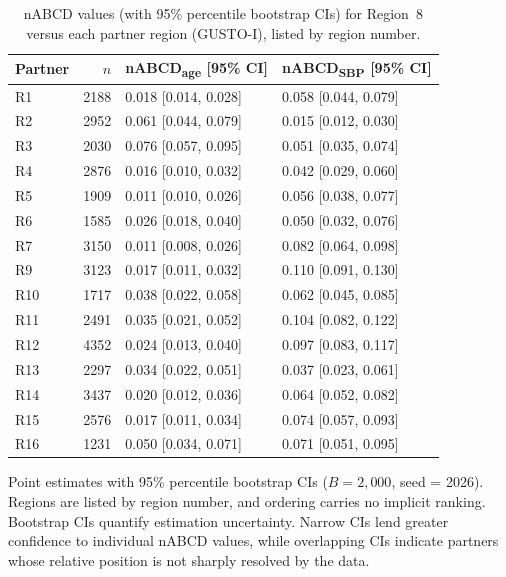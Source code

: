\documentclass[AMA,Times1COL]{WileyNJDv5}
\begin{document}
\begin{table}[ht]
\centering
\caption{nABCD values (with 95\% percentile bootstrap CIs) for Region~8 versus each partner region (GUSTO-I), listed by region number.\label{tab:gusto_nabcd}}
\begin{tabular}{lrll}
\toprule
\textbf{Partner} & $n$ & \textbf{nABCD\textsubscript{age} [95\% CI]} & \textbf{nABCD\textsubscript{SBP} [95\% CI]} \\
\midrule
R1  & 2188 & 0.018 [0.014, 0.028] & 0.058 [0.044, 0.079] \\
R2  & 2952 & 0.061 [0.044, 0.079] & 0.015 [0.012, 0.030] \\
R3  & 2030 & 0.076 [0.057, 0.095] & 0.051 [0.035, 0.074] \\
R4  & 2876 & 0.016 [0.010, 0.032] & 0.042 [0.029, 0.060] \\
R5  & 1909 & 0.011 [0.010, 0.026] & 0.056 [0.038, 0.077] \\
R6  & 1585 & 0.026 [0.018, 0.040] & 0.050 [0.032, 0.076] \\
R7  & 3150 & 0.011 [0.008, 0.026] & 0.082 [0.064, 0.098] \\
R9  & 3123 & 0.017 [0.011, 0.032] & 0.110 [0.091, 0.130] \\
R10 & 1717 & 0.038 [0.022, 0.058] & 0.062 [0.045, 0.085] \\
R11 & 2491 & 0.035 [0.021, 0.052] & 0.104 [0.082, 0.122] \\
R12 & 4352 & 0.024 [0.013, 0.040] & 0.097 [0.083, 0.117] \\
R13 & 2297 & 0.034 [0.022, 0.051] & 0.037 [0.023, 0.061] \\
R14 & 3437 & 0.020 [0.012, 0.036] & 0.064 [0.052, 0.082] \\
R15 & 2576 & 0.017 [0.011, 0.034] & 0.074 [0.057, 0.093] \\
R16 & 1231 & 0.050 [0.034, 0.071] & 0.071 [0.051, 0.095] \\
\bottomrule
\end{tabular}
\begin{tablenotes}
\item Point estimates with 95\% percentile bootstrap CIs ($B = 2{,}000$, seed = 2026). Regions are listed by region number, and ordering carries no implicit ranking. Bootstrap CIs quantify estimation uncertainty. Narrow CIs lend greater confidence to individual nABCD values, while overlapping CIs indicate partners whose relative position is not sharply resolved by the data.
\end{tablenotes}
\end{table}
\end{document}
